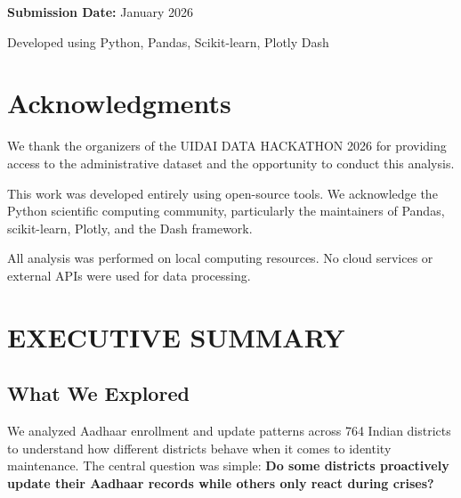 \documentclass[11pt, a4paper]{article}
\begin{document}
\begin{titlepage}
\vfill

\vspace{0.3cm}
{\small\textbf{Submission Date:} January 2026}

\vspace{0.2cm}
{\footnotesize Developed using Python, Pandas, Scikit-learn, Plotly Dash}

\end{titlepage}
\thispagestyle{empty}
\clearpage

{}
\section*{Acknowledgments}

We thank the organizers of the UIDAI DATA HACKATHON 2026 for providing access to the administrative dataset and the opportunity to conduct this analysis.

This work was developed entirely using open-source tools. We acknowledge the Python scientific computing community, particularly the maintainers of Pandas, scikit-learn, Plotly, and the Dash framework.

All analysis was performed on local computing resources. No cloud services or external APIs were used for data processing.
\clearpage

\tableofcontents

\vspace{2em}

{}
\listoffigures

\vspace{2em}

{}
\listoftables
\clearpage


\section{EXECUTIVE SUMMARY}

\subsection{What We Explored}

We analyzed Aadhaar enrollment and update patterns across 764 Indian districts to understand how different districts behave when it comes to identity maintenance. The central question was simple: \textbf{Do some districts proactively update their Aadhaar records while others only react during crises?}
\end{document}
